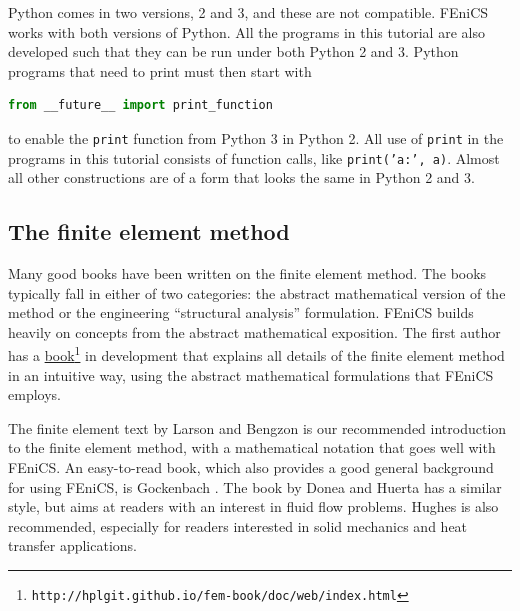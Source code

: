 \documentclass[graybox,envcountchap,sectrefs,final]{svmonodo}
\newenvironment{warning_mdfboxadmon}[1][]{
\begin{warning_mdfboxmdframed}[frametitle=#1]
}
{
\end{warning_mdfboxmdframed}
}
\begin{document}
\begin{warning_mdfboxadmon}
Python comes in two versions, 2 and 3, and these are not compatible.
FEniCS works with both versions of Python. All the
programs in this tutorial are also developed such that they can be run
under both Python 2 and 3. Python programs that need to print must
then start with

\begin{lstlisting}[language=Python,style=graycolor]
from __future__ import print_function
\end{lstlisting}
to  enable the \texttt{print} function from Python 3 in Python 2. All
use of \texttt{print} in the programs in this tutorial consists of function
calls, like \texttt{print('a:', a)}. Almost all other constructions are of
a form that looks the same in Python 2 and 3.

\end{warning_mdfboxadmon} %

\subsection{The finite element method}
\label{ftut:fembooks}


Many good books have been written on the finite element method. The
books typically fall in either of two categories: the abstract
mathematical version of the method or the engineering ``structural
analysis'' formulation. FEniCS builds heavily on concepts from the
abstract mathematical exposition. The first author has
a \href{{http://hplgit.github.io/fem-book/doc/web/index.html}}{book}\footnote{\texttt{http://hplgit.github.io/fem-book/doc/web/index.html}}
\cite{Langtangen_Mardal_FEM_2016} in development that
explains all details of the finite element method in an intuitive way,
using the abstract mathematical formulations that FEniCS employs.

The finite element text by Larson and Bengzon \cite{Larson_2013}
is our recommended introduction to the finite element method,
with a mathematical notation that goes well with FEniCS.
An easy-to-read book, which also provides a good general background for
using FEniCS, is Gockenbach \cite{Gockenbach2006}. The book by Donea
and Huerta \cite{DoneaHuerta2003} has a similar style, but aims at
readers with an interest in fluid flow problems. Hughes \cite{Hughes1987}
is also recommended, especially for readers interested in solid
mechanics and heat transfer applications.
\end{document}

